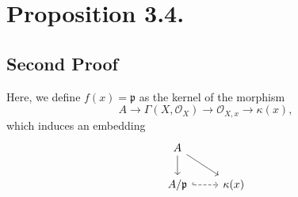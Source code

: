 \section{Proposition 3.4.}

\subsection{Second Proof}

Here, we define $f(x)=\mathfrak p$ as the kernel of the morphism 
\[A\to\Gamma(X,\mathcal O_X)\to \mathcal O_{X,x}\to \kappa (x),\] which induces an embedding 
\[\begin{tikzcd}
	A \\
	{A/\mathfrak p} & {\kappa (x)}
	\arrow[from=1-1, to=2-1]
	\arrow[from=1-1, to=2-2]
	\arrow[dashed, hook, from=2-1, to=2-2]
\end{tikzcd}\]